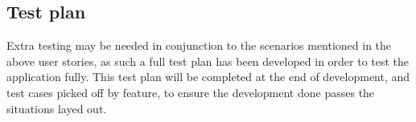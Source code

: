 \subsection{Test plan}
Extra testing may be needed in conjunction to the scenarios mentioned in the above user stories, as such a full test plan has been developed in order to test the application fully. This test plan will be completed at the end of development, and test cases picked off by feature, to ensure the development done passes the situations layed out.